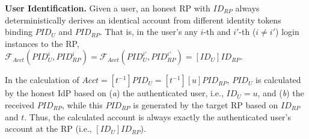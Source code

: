 
\vspace{0.5mm}
\noindent\textbf{User Identification.}
Given a user, an honest RP with $ID_{RP}$ always deterministically derives an identical account from different identity tokens binding $PID_U$ and $PID_{RP}$.
That is,
    in the user's any $i$-th and $i'$-th ($i \neq i'$) login instances to the RP,
 $\mathcal{F}_{Acct}(PID_{U}^i, PID_{RP}^i) = \mathcal{F}_{Acct}(PID_{U}^{i'}, PID_{RP}^{i'}) = [ID_U]ID_{RP}$.

In the calculation of $Acct = [t^{-1}]PID_U = [t^{-1}][u]PID_{RP}$,
$PID_U$ is calculated by the honest IdP based on (\emph{a}) the authenticated user, i.e., $ID_U = u$, and (\emph{b}) the received $PID_{RP}$, while this $PID_{RP}$ is generated by the target RP based on $ID_{RP}$ and $t$.
Thus, the calculated account is always exactly the authenticated user's account at the RP (i.e., $[ID_U]ID_{RP}$).




